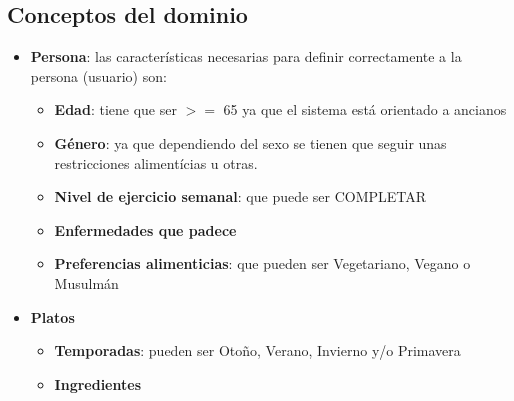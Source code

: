 \documentclass[12]{article}
\begin{document}
\subsection{Conceptos del dominio}
\begin{itemize}
\item \textbf{Persona}: las características necesarias para definir correctamente a la persona (usuario) son: \begin{itemize}
	\item \textbf{Edad}: tiene que ser $>=$ 65 ya que el sistema está orientado a ancianos
	\item \textbf{Género}: ya que dependiendo del sexo se tienen que seguir unas restricciones alimentícias u otras.
	\item \textbf{Nivel de ejercicio semanal}: que puede ser COMPLETAR
	\item \textbf{Enfermedades que padece}
	\item \textbf{Preferencias alimenticias}: que pueden ser Vegetariano, Vegano o Musulmán
	\end{itemize}
	
	\item \textbf{Platos}
	\begin{itemize}
		\item \textbf{Temporadas}: pueden ser Otoño, Verano, Invierno y/o Primavera
		\item \textbf{Ingredientes}		
	\end{itemize}


\end{itemize}
\end{document}
